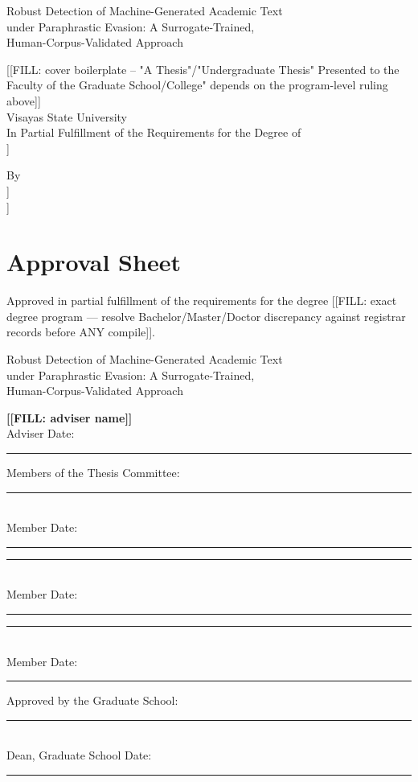 \documentclass[12pt,a4paper]{report}
\newcommand{\ThesisTitleA}{Robust Detection of Machine-Generated Academic Text\\
under Paraphrastic Evasion: A Surrogate-Trained,\\ Human-Corpus-Validated Approach}
\newcommand{\ThesisAuthor}{[[FILL: raw/administrative-requirements author block]]}
\newcommand{\ThesisProgram}{[[FILL: exact degree program --- resolve Bachelor/Master/Doctor discrepancy against registrar records before ANY compile]]}
\newcommand{\ThesisAdviser}{[[FILL: adviser name]]}
\newcommand{\ThesisMonthYear}{[[FILL: defense month year]]}
\begin{document}

\begin{titlepage}
  \centering
  \vspace*{1cm}
  {\large \ThesisTitleA \par}
  \vspace{2cm}
  {\large [[FILL: cover boilerplate -- "A Thesis"/"Undergraduate Thesis"
  Presented to the Faculty of the Graduate School/College" depends on the
  program-level ruling above]]\\
  Visayas State University\\[0.5em]
  In Partial Fulfillment of the Requirements for the Degree of\\
  \ThesisProgram \par}
  \vspace{2cm}
  {\large By\\ \ThesisAuthor \\ \ThesisMonthYear \par}
\end{titlepage}

\chapter*{Approval Sheet}
Approved in partial fulfillment of the requirements for the degree
\ThesisProgram{}.

\ThesisTitleA{}

\vspace{2em}
\textbf{\ThesisAdviser}\\ Adviser \hfill Date: \rule{3cm}{0.4pt}

\vspace{2em}
Members of the Thesis Committee:\\[1em]
\rule{6cm}{0.4pt}\\ Member \hfill Date: \rule{3cm}{0.4pt}

\vspace{1em}
\rule{6cm}{0.4pt}\\ Member \hfill Date: \rule{3cm}{0.4pt}

\vspace{1em}
\rule{6cm}{0.4pt}\\ Member \hfill Date: \rule{3cm}{0.4pt}

\vspace{2em}
Approved by the Graduate School:\\[1em]
\rule{6cm}{0.4pt}\\ Dean, Graduate School \hfill Date: \rule{3cm}{0.4pt}
\end{document}
